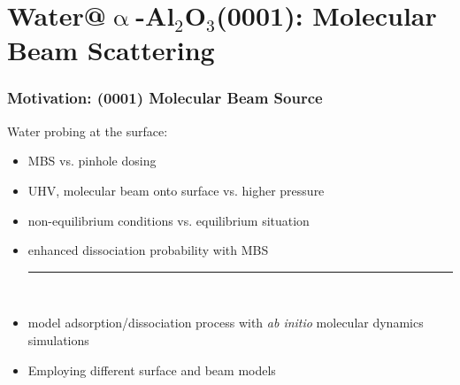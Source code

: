 \documentclass[hyperref={pdfpagelabels=false}]{beamer}
\begin{document}
\section{Water@$\upalpha$-Al$_2$O$_3$(0001): Molecular Beam Scattering~~~~~~~~~~}
\begin{frame}
 \frametitle{Motivation: (0001) Molecular Beam Source}
Water probing at the surface: 
 \begin{itemize}
 \item MBS vs. pinhole dosing
 \item UHV, molecular beam onto surface vs. higher pressure
 \item non-equilibrium conditions vs. equilibrium situation
 \item {\color{red} enhanced dissociation probability with MBS}
 \newline~
 \pause \hrule
 \newline~
 \item model adsorption/dissociation process with \textit{ab initio} molecular dynamics simulations
 \item Employing different surface and beam models
\end{itemize}
\pause
\newline~\newline~
\end{frame}
\end{document}

